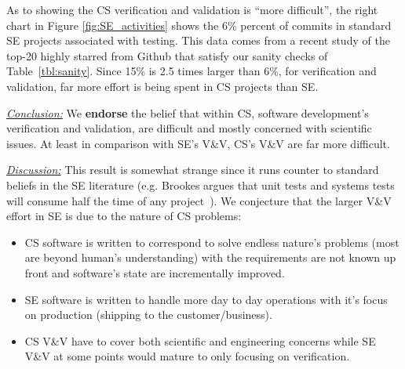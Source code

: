 \documentclass[sigconf,review,anonymous]{acmart}
\newcommand{\bi}{\begin{itemize}}
\newcommand{\ei}{\end{itemize}}
\newenvironment{RQ}{\vspace{1mm}\begin{tcolorbox}[enhanced,width=3.4in,size=fbox,colback=red!5!white,drop shadow southwest,sharp corners]}{\end{tcolorbox}}
\begin{document}
As to showing the CS verification and validation is ``more difficult'',
the right chart in Figure \ref{fig:SE_activities} shows the 6\% percent  of commits in standard SE projects
 associated with testing.  This data comes from a recent study \cite{tu2019better} of the top-20 highly starred from Github that satisfy our sanity checks of Table~\ref{tbl:sanity}.
Since 15\% is 2.5 times larger than 6\%, for verification and validation, 
far more effort is being spent in CS projects than SE.






\begin{RQ}
\textit{\underline{Conclusion:}}
We \textbf{endorse} the belief that within CS, software development's verification and validation, are difficult and mostly concerned with scientific issues. At least in comparison with SE's V\&V, CS's V\&V are far more difficult.
\end{RQ}  

\noindent \textit{\underline{Discussion:}} This result is somewhat strange since it runs counter to standard beliefs in the SE literature (e.g. Brookes argues that unit tests and systems tests will consume half the time of any project~\cite{brooks1995mythical}). We conjecture that the larger V\&V effort in SE  is due to the nature of CS problems:

\bi
\item CS software is written to correspond to solve endless nature's problems (most are beyond human's understanding) with the requirements are not known up front and software's state are incrementally improved. 
\item SE software is written to handle more day to day operations with it's focus on production (shipping to the customer/business). 
\item CS V\&V have to cover both scientific and engineering concerns while SE V\&V at some points would mature to only focusing on verification. 
\ei 
\end{document}
